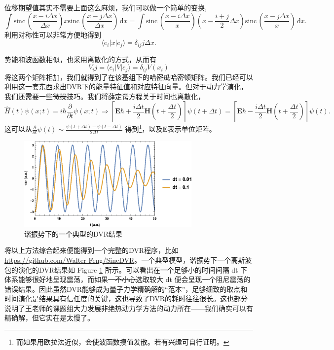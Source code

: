 \documentclass[12pt,a4paper,openany,twoside]{book}
\numberwithin{equation}{section}
\newcommand{\sinc}[1]{\mathrm{sinc} \, (#1)}
\begin{document}
      位移期望值其实不需要上面这么麻烦，我们可以做一个简单的变换,
      \[
      	\int \sinc{\frac{x- i \Delta x}{\Delta x}} x \sinc{\frac{x- j \Delta x}{\Delta x}}\, \mathrm{d} x = \int \sinc{\frac{x- i \Delta x}{x}} (x- \frac{i+j}{2}\Delta x) \sinc{\frac{x-j \Delta x}{x}}\, \mathrm{d}x
      .\] 
      利用对称性可以非常方便地得到
      \[
      	\langle e_i | x | e_j \rangle = \delta_{ij} j \Delta x
      .\] 
       
      势能和波函数相似，也采用离散化的方式，从而有
      \begin{equation}
      	V_ij = \langle e_i | V | e_j \rangle  = \delta_{ij} V(x_i)
      \end{equation}
      将这两个矩阵相加，我们就得到了在该基组下的\sout{哈密瓜}哈密顿矩阵。我们已经可以利用这一套东西求出DVR下的能量特征值和对应特征向量。但对于动力学演化，我们还需要一些\sout{微操}技巧。我们将薛定谔方程关于时间也离散化，
      \[
      	\hat{H}(t) \psi(x;t) = i \hbar \frac{\partial }{\partial t} \psi(x;t) \Rightarrow \left[\mathbf{E} \hbar + \frac{i \Delta t}{2} \mathbf{H}(t+\frac{\Delta t}{2})\right] \psi(t+ \Delta t) = \left[\mathbf{E} \hbar - \frac{i \Delta t}{2} \mathbf{H} (t+\frac{\Delta t}{2})\right] \psi(t)  
      .\] 
      这可以从$\frac{\partial }{\partial t} \psi(t) \sim \frac{\psi(t+ \Delta t) - \psi(t-\Delta t)}{2 \Delta t}$ 得到\footnote{而如果用欧拉法近似，会使波函数摸值发散。若有兴趣可自行证明。}，以及$\mathbf{E}$表示单位矩阵。

      \begin{figure}
        \centering
        \includegraphics[width=0.8\textwidth]{fig/DVRtest.eps}
        \caption{谐振势下的一个典型的DVR结果}
        \label{DVRresult}
      \end{figure}

      将以上方法综合起来便能得到一个完整的DVR程序，比如\url{https://github.com/Walter-Feng/SincDVR}。一个典型模型，谐振势下一个高斯波包的演化的DVR结果如 Figure \ref{DVRresult} 所示。可以看出在一个足够小的时间间隔 dt 下体系能够很好地呈现震荡，而如果\sout{一不小心}选取较大 dt 便会呈现一个阻尼震荡的错误结果。因此虽然DVR能够成为量子力学精确解的``范本''，足够细致的取点和时间演化是结果具有信任度的关键，这也导致了DVR的耗时往往很长。这也部分说明了王老师的课题组大力发展非绝热动力学方法的动力所在——我们确实可以有精确解，但它实在是太慢了。
\end{document}
